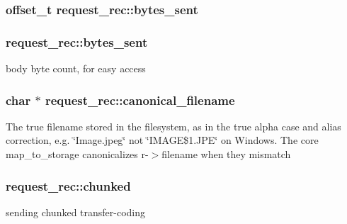 \subsubsection[{\texorpdfstring{bytes\+\_\+sent}{bytes_sent}}]{\setlength{\rightskip}{0pt plus 5cm}offset\+\_\+t request\+\_\+rec\+::bytes\+\_\+sent}\hypertarget{structrequest__rec_a8e626c2b8ebc0156e1517cce657cdb90}{}\label{structrequest__rec_a8e626c2b8ebc0156e1517cce657cdb90}
\subsubsection[{\texorpdfstring{bytes\+\_\+sent}{bytes_sent}}]{ request\+\_\+rec\+::bytes\+\_\+sent}\hypertarget{structrequest__rec_a1c423f9f437b73f9ca95b4aa2e6bf62c}{}\label{structrequest__rec_a1c423f9f437b73f9ca95b4aa2e6bf62c}
body byte count, for easy access 
\subsubsection[{\texorpdfstring{canonical\+\_\+filename}{canonical_filename}}]{\setlength{\rightskip}{0pt plus 5cm}char $\ast$ request\+\_\+rec\+::canonical\+\_\+filename}\hypertarget{structrequest__rec_af1008f929214e52e532f8eb05ac6acb2}{}\label{structrequest__rec_af1008f929214e52e532f8eb05ac6acb2}
The true filename stored in the filesystem, as in the true alpha case and alias correction, e.\+g. \char`\"{}\+Image.\+jpeg\char`\"{} not \char`\"{}\+I\+M\+A\+G\+E\$1.\+J\+P\+E\char`\"{} on Windows. The core map\+\_\+to\+\_\+storage canonicalizes r-\/$>$filename when they mismatch 
\subsubsection[{\texorpdfstring{chunked}{chunked}}]{ request\+\_\+rec\+::chunked}\hypertarget{structrequest__rec_ab090d5baf7083066585d9303048da954}{}\label{structrequest__rec_ab090d5baf7083066585d9303048da954}
sending chunked transfer-\/coding 
